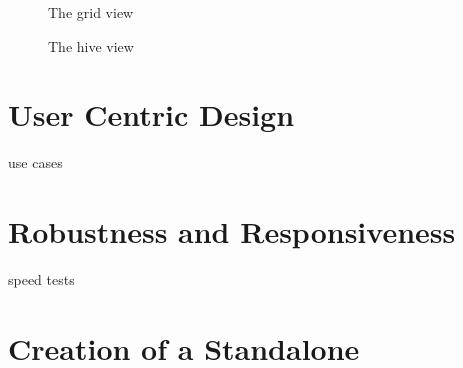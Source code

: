 \begin{figure}[ht]
\centering
\caption{The grid view}
\label{fig:grid}
\end{figure}

\begin{figure}[ht]
\centering
\caption{The hive view}
\label{fig:hive}
\end{figure}

	
\section{User Centric Design}
	use cases

\section{Robustness and Responsiveness}
	speed tests

\section{Creation of a Standalone}